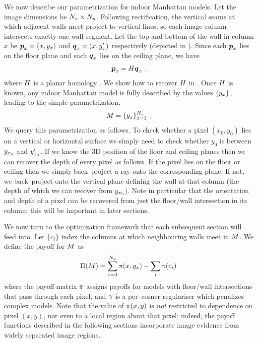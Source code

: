 We now describe our parametrization for indoor Manhattan models. Let
the image dimensions be $N_x \times N_y$. Following
rectification, the vertical seams at which adjacent walls meet project
to vertical lines, so each image column intersects exactly one wall
segment. Let the top and bottom of the wall in column $x$ be
$\boldsymbol{p}_x=(x,y_x)$ and $\boldsymbol{q}_x=(x,y_x')$ respectively (depicted in
). Since each $\boldsymbol{p}_x$ lies on the floor plane
and each $\boldsymbol{q}_x$ lies on the ceiling plane, we have
\begin{equation}
\label{eq:manhattan-homology}
  \boldsymbol{p}_x = H \boldsymbol{q}_x ~.
\end{equation}
where $H$ is a planar homology \cite{Criminisi01}. We show how to
recover $H$ in . Once $H$ is known, any
indoor Manhattan model is fully described by the values $\{y_x\}$,
leading to the simple parametrization,
\begin{equation}
  M = \{ y_x \}_{x=1}^{N_x} ~.
\end{equation}
We query this parametrization as follows. To check whether a pixel
$(x_0,y_0)$ lies on a vertical or horizontal surface we simply need to
check whether $y_0$ is between $y_{x_0}$ and $y_{x_0}'$. If we know the
3D position of the floor and ceiling planes then we can recover the
depth of every pixel as follows. If the pixel lies on the floor or
ceiling then we simply back--project a ray onto the corresponding
plane. If not, we back--project onto the vertical plane defining the
wall at that column (the depth of which we can recover from
$y_{x_0}$). Note in particular that the orientation and depth of a
pixel can be recovered from just the floor/wall intersection in its
column; this will be important in later sections.

We now turn to the optimization framework that each subsequent section
will feed into. Let $\{c_i\}$ index the columns at which neighbouring
walls meet in $M$. We define the payoff for $M$ as
\begin{equation}
  \label{eq:payoffs}
  \Pi(M) = 
  \sum_{x=1}^{N_x} \pi(x,y_x) -
  \sum_i \gamma(c_i) \,
\end{equation}
where the payoff matrix $\pi$ assigns payoffs for models with
floor/wall intersections that pass through each pixel, and
$\gamma$ is a per--corner regulariser which penalizes complex
models. Note that the value of $\pi(x,y)$ is \textit{not}
restricted to dependence on pixel $(x,y)$, nor even to a local region
about that pixel; indeed, the payoff functions described in the
following sections incorporate image evidence from widely separated
image regions.

